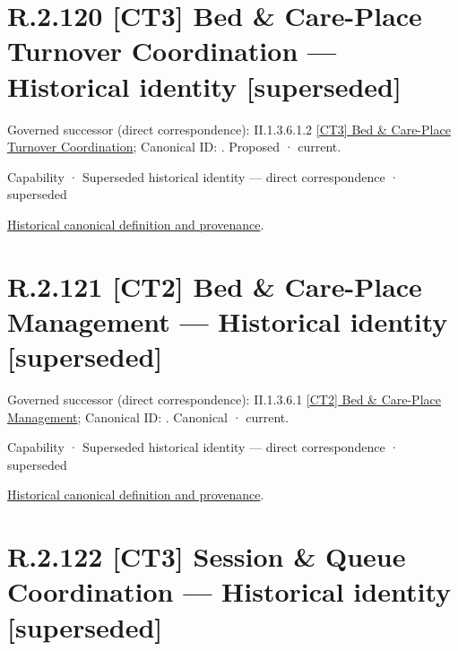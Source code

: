 \section*{R.2.120 [CT3] Bed \& Care-Place Turnover Coordination — Historical identity [superseded]}
\label{navigation:R.2.120}

{\small Governed successor (direct correspondence): II.1.3.6.1.2 \hyperref[element:3c9464f9eae1415d8fa041bd1f3da4f2]{[CT3] Bed \& Care-Place Turnover Coordination}; Canonical ID: \texttt{}. Proposed · current.}\par
\label{element:a50662edda954bc58c44184d84591d5b}
{\small Capability · Superseded historical identity — direct correspondence · superseded}\par
\href{../../../../continuum/strategy/capability/a50662edda954bc58c44184d84591d5b.md}{Historical canonical definition and provenance}.\par
\section*{R.2.121 [CT2] Bed \& Care-Place Management — Historical identity [superseded]}
\label{navigation:R.2.121}

{\small Governed successor (direct correspondence): II.1.3.6.1 \hyperref[element:f117ccec0bfa4f738e6ddb646b3534a2]{[CT2] Bed \& Care-Place Management}; Canonical ID: \texttt{}. Canonical · current.}\par
\label{element:c94d29b7d1c045dabc7814ceea795484}
{\small Capability · Superseded historical identity — direct correspondence · superseded}\par
\href{../../../../continuum/strategy/capability/c94d29b7d1c045dabc7814ceea795484.md}{Historical canonical definition and provenance}.\par
\section*{R.2.122 [CT3] Session \& Queue Coordination — Historical identity [superseded]}
\label{navigation:R.2.122}

